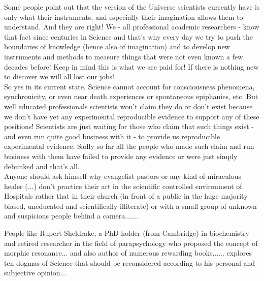	\begin{tcolorbox}[title=Remark,colframe=black,arc=10pt]
	Some people point out that the version of the Universe scientists currently have is only what their instruments, and especially their imagination allows them to understand. And they are right! We - all professional academic researchers - know that fact since centuries in Science and that's why every day we try to push the boundaries of knowledge (hence also of imagination) and to develop new instruments and methods to measure things that were not even known a few decades before! Keep in mind this is what we are paid for! If there is nothing new to discover we will all lost our jobs!\\
	
	So yes in its current state, Science cannot account for consciousness phenomena, synchronicity, or even near death experiences or spontaneous epiphanies, etc. But well educated professionals scientists won't claim they do or don't exist because we don't have yet any experimental reproducible evidence to support any of these positions! Scientists are just waiting for those who claim that such things exist - and even run quite good business with it - to provide us reproducible experimental evidence. Sadly so far all the people who made such claim and run business with them have failed to provide any evidence or were just simply debunked and that's all.\\
	
	Anyone should ask himself why evangelist pastors or any kind of miraculous healer (...) don't practice their art in the scientific controlled environment of  Hospitals rather that in their church (in front of a public in the huge majority biased, uneducated and scientifically illiterate) or with a small group of unknown and suspicious people behind a camera.......
	\end{tcolorbox}
	 
	People like Rupert Sheldrake, a PhD holder (from Cambridge) in biochemistry and retired researcher in the field of parapsychology who proposed the concept of morphic resonance... and also author of numerous rewarding books...... explores ten dogmas of Science that should be reconsidered according to his personal and subjective opinion... 
	
